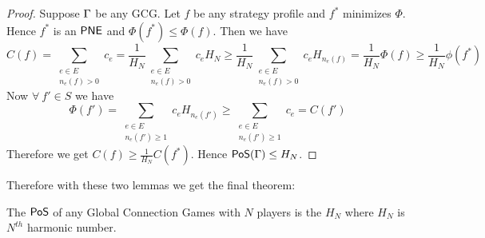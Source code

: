 \begin{proof}
	Suppose $\Gamma$ be any GCG. Let $f$ be any strategy profile and $f^*$ minimizes $\Phi$. Hence $f^*$ is an $\operatorname{\mathsf{PNE}}$ and $\Phi(f^*)\leq \Phi(f)$. Then we have $$C(f)=\sum\limits_{\substack{e\in E\\ n_e(f)>0}}c_e=\frac1{H_N}\sum\limits_{\substack{e\in E\\ n_e(f)>0}}c_eH_N\geq \frac1{H_N}\sum\limits_{\substack{e\in E\\ n_e(f)>0}}c_eH_{n_e(f)}=\frac1{H_N}\Phi(f)\geq \frac1{H_N}\phi(f^*)$$Now  $\forall \ f'\in S$ we have $$\Phi(f')=\sum\limits_{\substack{e\in E\\ n_e(f')\geq 1}}c_eH_{n_e(f')}\geq \sum\limits_{\substack{e\in E\\ n_e(f')\geq 1}}c_e=C(f')$$Therefore we get $C(f)\geq \frac1{H_N}C(f^*)$. Hence $\operatorname{\mathsf{PoS}}(\Gamma)\leq H_N$.
\end{proof}


Therefore with these two lemmas we get the final theorem:
\begin{Theorem}{}{}
	The $\operatorname{\mathsf{PoS}}$ of any Global Connection Games with $N$ players is the  $H_N$ where $H_N$ is $N^{th}$ harmonic number.
\end{Theorem}